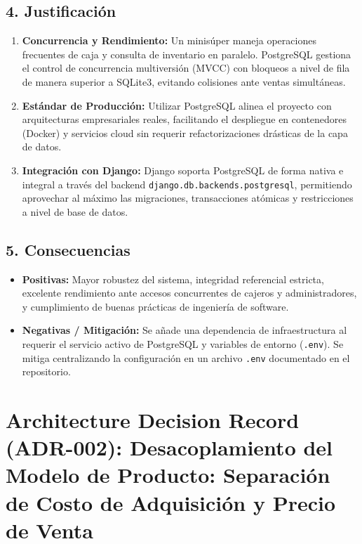 \documentclass[11pt,a4paper]{article}
\begin{document}
\subsection{4. Justificación}
\begin{enumerate}
    \item \textbf{Concurrencia y Rendimiento:} Un minisúper maneja operaciones frecuentes de caja y consulta de inventario en paralelo. PostgreSQL gestiona el control de concurrencia multiversión (MVCC) con bloqueos a nivel de fila de manera superior a SQLite3, evitando colisiones ante ventas simultáneas.
    \item \textbf{Estándar de Producción:} Utilizar PostgreSQL alinea el proyecto con arquitecturas empresariales reales, facilitando el despliegue en contenedores (Docker) y servicios cloud sin requerir refactorizaciones drásticas de la capa de datos.
    \item \textbf{Integración con Django:} Django soporta PostgreSQL de forma nativa e integral a través del backend \texttt{django.db.backends.postgresql}, permitiendo aprovechar al máximo las migraciones, transacciones atómicas y restricciones a nivel de base de datos.
\end{enumerate}

\subsection{5. Consecuencias}
\begin{itemize}[leftmargin=*]
    \item \textbf{Positivas:} Mayor robustez del sistema, integridad referencial estricta, excelente rendimiento ante accesos concurrentes de cajeros y administradores, y cumplimiento de buenas prácticas de ingeniería de software.
    \item \textbf{Negativas / Mitigación:} Se añade una dependencia de infraestructura al requerir el servicio activo de PostgreSQL y variables de entorno (\texttt{.env}). Se mitiga centralizando la configuración en un archivo \texttt{.env} documentado en el repositorio.
\end{itemize}

\newpage

\section{Architecture Decision Record (ADR-002): Desacoplamiento del Modelo de Producto: Separación de Costo de Adquisición y Precio de Venta}
\end{document}
